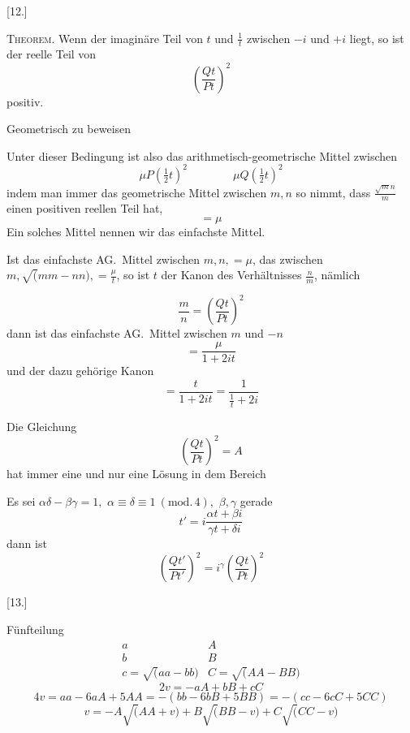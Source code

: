 \begingroup
\renewcommand{\arraystretch}{1.45}

\par\medskip{}\centerline{[12.]}\nobreak\smallskip
\textsc{Theorem.} Wenn der imaginäre Teil von \(t\) und \(\frac1t\) zwischen \(-i\) und
\(+i\) liegt, so ist der reelle Teil von
\[
\left(\frac{Qt}{Pt}\right)^2
\]
positiv.

\noindent\begin{minipage}{.45\linewidth}
Geometrisch zu beweisen
\end{minipage}\hfill
\resizebox{.47\linewidth}{!}{}


Unter dieser Bedingung ist also das arithmetisch-geometrische Mittel zwischen
\[
\mu P(\tfrac12t)^2\qquad\qquad\mu Q(\tfrac12t)^2
\]
indem man immer das geometrische Mittel zwischen \(m,n\) so nimmt, dass
\(\frac{\surd mn}{m}\) einen positiven reellen Teil hat,
\[
=\mu
\]
Ein solches Mittel nennen wir das einfachste Mittel.


Ist das einfachste AG.\ Mittel zwischen \(m,n,=\mu\), das zwischen
\(m,\surd(mm-nn),=\frac\mu t\), so ist \(t\) der Kanon des Verhältnisses
\(\frac nm\), nämlich

\[
\frac mn=\left(\frac{Qt}{Pt}\right)^2
\]
dann ist das einfachste AG.\ Mittel zwischen \(m\) und \(-n\)
\[
=\frac\mu{1+2it}
\]
und der dazu gehörige Kanon
\[
=\frac t{1+2it}=\frac1{\frac1t+2i}
\]


Die Gleichung
\[
\left(\frac{Qt}{Pt}\right)^2=A
\]
hat immer eine und nur eine Lösung in dem Bereich
\begin{center}
\resizebox{.48\linewidth}{!}{}
\end{center}


Es sei \(\alpha\delta-\beta\gamma=1,\)
\(\alpha\equiv\delta\equiv1\ (\mathrm{mod.}\,4),\)
\(\beta,\gamma\) gerade
\[
t'=i\frac{\alpha t+\beta i}{\gamma t+\delta i}
\]
dann ist
\[
\left(\frac{Qt'}{Pt'}\right)^2=i^\gamma\left(\frac{Qt}{Pt}\right)^2
\]


\par\medskip{}\centerline{[13.]}\nobreak\smallskip
Fünfteilung
\[
\begin{array}{ll}
a&A\\[8pt]
b&B\\[8pt]
c=\surd(aa-bb)&C=\surd(AA-BB)
\end{array}
\]
\[
2v=-aA+bB+cC
\]
\[
4v=aa-6aA+5AA=-(bb-6bB+5BB)=-(cc-6cC+5CC)
\]
\[
v=-A\surd(AA+v)+B\surd(BB-v)+C\surd(CC-v)
\]


